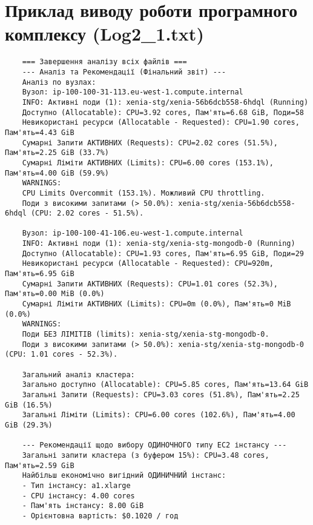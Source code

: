 \chapter{Приклад виводу роботи програмного комплексу (Log2\_1.txt)}
\begingroup
\small
\begin{verbatim}
	=== Завершення аналізу всіх файлів === 
	--- Аналіз та Рекомендації (Фінальний звіт) --- 
	Аналіз по вузлах: 
	Вузол: ip-100-100-31-113.eu-west-1.compute.internal 
	INFO: Активні поди (1): xenia-stg/xenia-56b6dcb558-6hdql (Running) 
	Доступно (Allocatable): CPU=3.92 cores, Пам'ять=6.68 GiB, Поди=58 
	Невикористані ресурси (Allocatable - Requested): CPU=1.90 cores, Пам'ять=4.43 GiB 
	Сумарні Запити АКТИВНИХ (Requests): CPU=2.02 cores (51.5%), Пам'ять=2.25 GiB (33.7%) 
	Сумарні Ліміти АКТИВНИХ (Limits): CPU=6.00 cores (153.1%), Пам'ять=4.00 GiB (59.9%) 
	WARNINGS: 
	CPU Limits Overcommit (153.1%). Можливий CPU throttling. 
	Поди з високими запитами (> 50.0%): xenia-stg/xenia-56b6dcb558-6hdql (CPU: 2.02 cores - 51.5%).
	
	Вузол: ip-100-100-41-106.eu-west-1.compute.internal 
	INFO: Активні поди (1): xenia-stg/xenia-stg-mongodb-0 (Running) 
	Доступно (Allocatable): CPU=1.93 cores, Пам'ять=6.95 GiB, Поди=29 
	Невикористані ресурси (Allocatable - Requested): CPU=920m, Пам'ять=6.95 GiB 
	Сумарні Запити АКТИВНИХ (Requests): CPU=1.01 cores (52.3%), Пам'ять=0.00 MiB (0.0%)
	Сумарні Ліміти АКТИВНИХ (Limits): CPU=0m (0.0%), Пам'ять=0 MiB (0.0%) 
	WARNINGS: 
	Поди БЕЗ ЛІМІТІВ (limits): xenia-stg/xenia-stg-mongodb-0. 
	Поди з високими запитами (> 50.0%): xenia-stg/xenia-stg-mongodb-0 (CPU: 1.01 cores - 52.3%).
	
	Загальний аналіз кластера: 
	Загально доступно (Allocatable): CPU=5.85 cores, Пам'ять=13.64 GiB 
	Загальні Запити (Requests): CPU=3.03 cores (51.8%), Пам'ять=2.25 GiB (16.5%) 
	Загальні Ліміти (Limits): CPU=6.00 cores (102.6%), Пам'ять=4.00 GiB (29.3%)
	
	--- Рекомендації щодо вибору ОДИНОЧНОГО типу EC2 інстансу --- 
	Загальні запити кластера (з буфером 15%): CPU=3.48 cores, Пам'ять=2.59 GiB 
	Найбільш економічно вигідний ОДИНИЧНИЙ інстанс:
	- Тип інстансу: a1.xlarge 
	- CPU інстансу: 4.00 cores 
	- Пам'ять інстансу: 8.00 GiB 
	- Орієнтовна вартість: $0.1020 / год
\end{verbatim}
\endgroup

